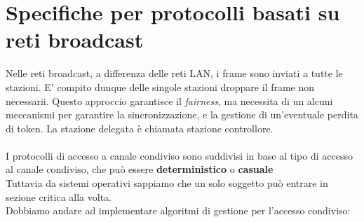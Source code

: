 \documentclass[11pt, oneside]{article}   	%
\begin{document}
\section*{Specifiche per protocolli basati su reti broadcast}
Nelle reti broadcast, a differenza delle reti LAN, i frame sono inviati a tutte le stazioni. E' compito dunque delle singole stazioni droppare il frame non necessarii. Questo approccio garantisce il \emph{fairness}, ma necessita di un alcuni meccanismi per garantire la sincronizzazione, e la gestione di un'eventuale perdita di token. La stazione delegata è chiamata stazione controllore.\\\\
I protocolli di accesso a canale condiviso sono suddivisi in base al tipo di accesso al canale condiviso, che può essere \textbf{deterministico} o  \textbf{casuale}\\
 Tuttavia da sistemi operativi sappiamo che un solo soggetto può entrare in sezione critica alla volta. \\
Dobbiamo andare ad implementare algoritmi di gestione per l'accesso condiviso:
\end{document}
